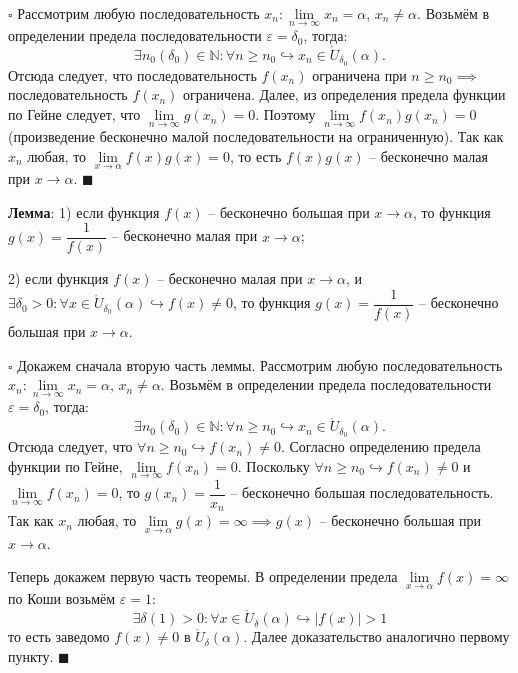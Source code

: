 \documentclass[12pt, a4paper, reqno]{article}
\begin{document}
    $\square$ Рассмотрим любую последовательность $x_n: \lim\limits_{n\to\infty} x_n = \alpha$,
    $x_n \neq \alpha$. Возьмём в определении предела последовательности $\varepsilon = \delta_0$,
    тогда:
    \begin{equation*}
        \exists n_0(\delta_0)\in\mathbb{N}: \forall n\geq n_0\hookrightarrow x_n\in \mathring
        U_{\delta_0}(\alpha).
    \end{equation*}
    Отсюда следует, что последовательность $f(x_n)$ ограничена при $n \geq n_0 \implies$
    последовательность $f(x_n)$ ограничена. Далее, из определения предела функции по Гейне следует,
    что $\lim\limits_{n\to\infty} g(x_n) = 0$. Поэтому $\lim\limits_{n\to\infty} f(x_n)g(x_n) = 0$
    (произведение бесконечно малой последовательности на ограниченную). Так как $x_n$ любая, то
    $\lim\limits_{x\to\alpha} f(x)g(x) = 0$, то есть $f(x)g(x)$ -- бесконечно малая при
    $x\to\alpha$. $\blacksquare$

    \textbf{Лемма}: 1) если функция $f(x)$ -- бесконечно большая при $x\to\alpha$, то функция
    $g(x) = \dfrac{1}{f(x)}$ -- бесконечно малая при $x\to\alpha$;

    2) если функция $f(x)$ -- бесконечно малая при $x\to\alpha$, и $\exists\delta_0 > 0: \forall
    x\in\mathring U_{\delta_0}(\alpha) \hookrightarrow f(x) \neq 0$, то функция $g(x) =
    \dfrac{1}{f(x)}$ -- бесконечно большая при $x\to\alpha$.

    $\square$ Докажем сначала вторую часть леммы. Рассмотрим любую последовательность $x_n:
    \lim\limits_{n\to\infty} x_n = \alpha$, $x_n \neq \alpha$. Возьмём в определении предела
    последовательности $\varepsilon = \delta_0$, тогда:
    \begin{equation*}
        \exists n_0(\delta_0)\in\mathbb{N}: \forall n\geq n_0\hookrightarrow x_n\in \mathring
        U_{\delta_0}(\alpha).
    \end{equation*}
    Отсюда следует, что $\forall n\geq n_0\hookrightarrow f(x_n) \neq 0$. Согласно определению
    предела функции по Гейне, $\lim\limits_{n\to\infty} f(x_n) = 0$. Поскольку $\forall n\geq
    n_0\hookrightarrow f(x_n) \neq 0$ и $\lim\limits_{n\to\infty} f(x_n) = 0$, то $g(x_n) =
    \dfrac{1}{x_n}$ -- бесконечно большая последовательность. Так как $x_n$ любая, то
    $\lim\limits_{x\to\alpha} g(x) = \infty \implies g(x)$ -- бесконечно большая при $x\to\alpha$.

    Теперь докажем первую часть теоремы. В определении предела $\lim\limits_{x\to\alpha} f(x) =
    \infty$ по Коши возьмём $\varepsilon = 1$:
    \begin{equation*}
        \exists\delta(1) > 0: \forall x\in\mathring U_{\delta}(\alpha)\hookrightarrow |f(x)| > 1
    \end{equation*}
    то есть заведомо $f(x) \neq 0$ в $\mathring U_{\delta}(\alpha)$. Далее доказательство аналогично
    первому пункту. $\blacksquare$
\end{document}
